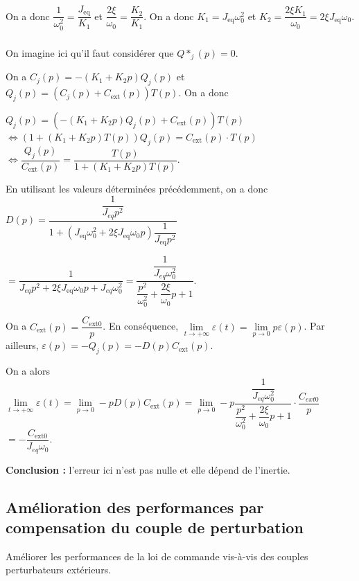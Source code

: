 \documentclass[10pt,fleqn]{article} %
\begin{document}
On a donc $\dfrac{1}{\omega_0^2}=\dfrac{J_{\text{eq}}}{K_1}$ et $\dfrac{2\xi}{\omega_0}=\dfrac{K_2}{K_1}$. On a donc $K_1=J_{\text{eq}}\omega_0^2$ et $K_2=\dfrac{2\xi K_1}{\omega_0}=2\xi J_{\text{eq}}\omega_0$.

\subparagraph{}%
On imagine ici qu'il faut considérer que $Q*_j(p)=0$.

On a $C_j(p)=-\left(K_1+K_2 p\right) Q_j(p)$ et $Q_j(p)=\left(C_j(p)+C_{\text{ext}}(p)\right)T(p)$.  On a donc  



$Q_j(p)=\left(-\left(K_1+K_2 p\right) Q_j(p)+C_{\text{ext}}(p)\right)T(p)$
$\Leftrightarrow \left(1+\left(K_1+K_2 p\right)T(p) \right)Q_j(p)=C_{\text{ext}}(p)\cdot T(p)$
$\Leftrightarrow \dfrac{Q_j(p)}{C_{\text{ext}}(p)}=\dfrac{T(p)}{1+\left(K_1+K_2 p\right)T(p) }$.

En utilisant les valeurs déterminées précédemment, on a donc $D(p)=\dfrac{\dfrac{1}{J_{eq}p^2}}{1+\left(J_{\text{eq}}\omega_0^2+2\xi J_{\text{eq}}\omega_0 p\right)\dfrac{1}{J_{\text{eq}}p^2} }$

$=\dfrac{1}{J_{eq}p^2+2\xi J_{\text{eq}}\omega_0 p+J_{eq}\omega_0^2}=\dfrac{\dfrac{1}{J_{eq}\omega_0^2}}{\dfrac{p^2}{\omega_0^2}+\dfrac{2\xi}{\omega_0}p+1}$.

On a $C_{\text{ext}}(p)=\dfrac{C_{\text{ext} 0}}{p}$. En conséquence, 
$\lim\limits_{t\to +\infty} \varepsilon(t) = \lim\limits_{p\to 0} p\varepsilon(p)$.
Par ailleurs,  $\varepsilon(p)=-Q_j(p)=-D(p)C_{\text{ext}}(p)$.

On a alors $\lim\limits_{t\to +\infty} \varepsilon(t) = \lim\limits_{p\to 0} -pD(p)C_{\text{ext}}(p)= \lim\limits_{p\to 0} -p\dfrac{\dfrac{1}{J_{eq}\omega_0^2}}{\dfrac{p^2}{\omega_0^2}+\dfrac{2\xi}{\omega_0}p+1}\cdot \dfrac{C_{ext0}}{p}$
$=  -\dfrac{C_{\text{ext} 0}}{J_{eq}\omega_0}$.

\textbf{Conclusion :} l'erreur ici n'est pas nulle et elle dépend de l'inertie. 


\subsection{Amélioration des performances par compensation du couple de perturbation}
\begin{obj}
Améliorer les performances de la loi de commande vis-à-vis des couples perturbateurs extérieurs.
\end{obj}
\end{document}

